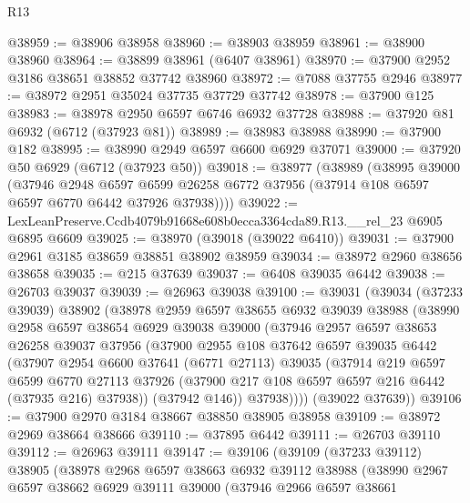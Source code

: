 \begin{lexlean}{R13}
\begin{coremodule}
@38959 := @38906 @38958
@38960 := @38903 @38959
@38961 := @38900 @38960
@38964 := @38899 @38961 (@6407 @38961)
@38970 := @37900 @2952 @3186 @38651 @38852 @37742 @38960
@38972 := @7088 @37755 @2946
@38977 := @38972 @2951 @35024 @37735 @37729 @37742
@38978 := @37900 @125
@38983 := @38978 @2950 @6597 @6746 @6932 @37728
@38988 := @37920 @81 @6932 (@6712 (@37923 @81))
@38989 := @38983 @38988
@38990 := @37900 @182
@38995 := @38990 @2949 @6597 @6600 @6929 @37071
@39000 := @37920 @50 @6929 (@6712 (@37923 @50))
@39018 := @38977
    (@38989
      (@38995
        @39000
        (@37946
          @2948
          @6597
          @6599
          @26258
          @6772
          @37956
          (@37914 @108 @6597 @6597 @6770 @6442 @37926 @37938))))
@39022 := LexLeanPreserve.Ccdb4079b91668e608b0ecca3364cda89.R13.__rel_23 @6905 @6895 @6609
@39025 := @38970 (@39018 (@39022 @6410))
@39031 := @37900 @2961 @3185 @38659 @38851 @38902 @38959
@39034 := @38972 @2960 @38656 @38658
@39035 := @215 @37639
@39037 := @6408 @39035 @6442
@39038 := @26703 @39037
@39039 := @26963 @39038
@39100 := @39031
    (@39034
      (@37233 @39039)
      @38902
      (@38978
        @2959
        @6597
        @38655
        @6932
        @39039
        @38988
        (@38990
          @2958
          @6597
          @38654
          @6929
          @39038
          @39000
          (@37946
            @2957
            @6597
            @38653
            @26258
            @39037
            @37956
            (@37900
              @2955
              @108
              @37642
              @6597
              @39035
              @6442
              (@37907
                @2954
                @6600
                @37641
                (@6771 @27113)
                @39035
                (@37914
                  @219
                  @6597
                  @6599
                  @6770
                  @27113
                  @37926
                  (@37900 @217 @108 @6597 @6597 @216 @6442 (@37935 @216) @37938))
                (@37942 @146))
              @37938))))
      (@39022 @37639))
@39106 := @37900 @2970 @3184 @38667 @38850 @38905 @38958
@39109 := @38972 @2969 @38664 @38666
@39110 := @37895 @6442
@39111 := @26703 @39110
@39112 := @26963 @39111
@39147 := @39106
    (@39109
      (@37233 @39112)
      @38905
      (@38978
        @2968
        @6597
        @38663
        @6932
        @39112
        @38988
        (@38990
          @2967
          @6597
          @38662
          @6929
          @39111
          @39000
          (@37946
            @2966
            @6597
            @38661

\end{coremodule}
\end{lexlean}
